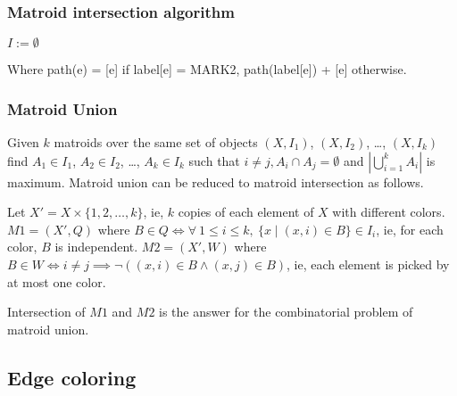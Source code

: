 \documentclass[a4paper,10pt,oneside]{article}
\begin{document}
\begin{multicols}{2}
\subsubsection{Matroid intersection algorithm}
\begin{algorithm}[H]
\SetAlgoLined
{}
$I := \emptyset$\;
\end{algorithm}

Where path(e) = [e] if label[e] = MARK2, path(label[e]) + [e] otherwise.

\subsubsection{Matroid Union}
Given $k$ matroids over the same set of objects $(X, I_1)$, $(X, I_2)$, \dots, $(X, I_k)$ find $A_1 \in I_1$, $A_2 \in I_2$, \dots, $A_k \in I_k$ such that $i \not= j, A_i \cap A_j = \emptyset$ and $|\bigcup\limits_{i=1}^{k} A_i|$ is maximum. Matroid union can be reduced to matroid intersection as follows.

Let $X' = X \times \{1, 2, \dots, k\}$, ie, $k$ copies of each element of $X$ with different colors. $M1 = (X', Q)$ where $B \in Q \iff \forall ~1 \le i \le k, ~\{x\mid (x, i) \in B\} \in I_i$, ie, for each color, $B$ is independent. $M2 = (X', W)$ where $B \in W \iff i \not= j \implies \lnot((x, i) \in B \land (x, j) \in B)$, ie, each element is picked by at most one color.

Intersection of $M1$ and $M2$ is the answer for the combinatorial problem of matroid union.
\subsection{Edge coloring}


\end{multicols}
\end{document}
